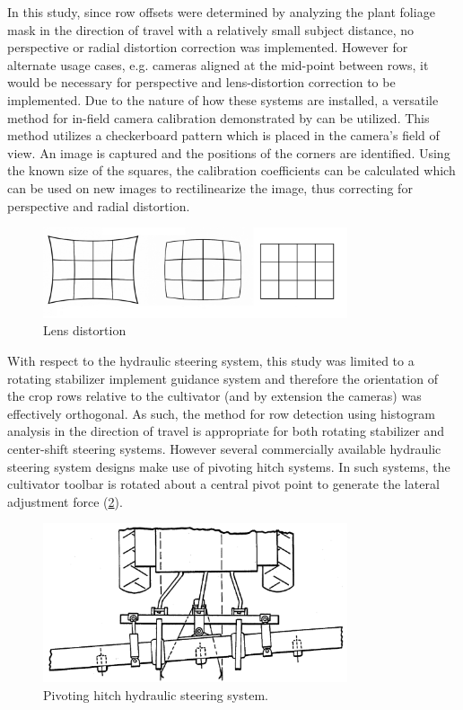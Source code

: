 \documentclass[authoryear]{elsarticle}
\begin{document}
In this study, since row offsets were determined by analyzing the
plant foliage mask in the direction of travel with a relatively small
subject distance, no perspective or radial distortion correction was
implemented. However for alternate usage cases, e.g. cameras aligned
at the mid-point between rows, it would be necessary for perspective
and lens-distortion correction to be implemented. Due to the nature of
how these systems are installed, a versatile method for in-field
camera calibration demonstrated by \citet{lee2002} can be
utilized. This method utilizes a checkerboard pattern which is placed
in the camera’s field of view. An image is captured and the positions
of the corners are identified. Using the known size of the squares,
the calibration coefficients can be calculated which can be used on
new images to rectilinearize the image, thus correcting for
perspective and radial distortion.

\begin{figure}
  \centering
  \includegraphics[width=0.8\textwidth,natwidth=610,natheight=642]{lens_distortion.jpg}
  \caption{Lens distortion}
  \label{fig:distortion}
\end{figure}

With respect to the hydraulic steering system, this study was limited
to a rotating stabilizer implement guidance system
and therefore the orientation of the crop rows relative to the
cultivator (and by extension the cameras) was effectively
orthogonal. As such, the method for row detection using histogram
analysis in the direction of travel is appropriate for both rotating
stabilizer and center-shift steering systems. However several
commercially available hydraulic steering system designs make use of
pivoting hitch systems. In such systems, the cultivator toolbar is
rotated about a central pivot point to generate the lateral adjustment
force (\ref{fig:pivoting_hitch}).

\begin{figure}
  \centering
  \includegraphics[width=0.8\textwidth,natwidth=610,natheight=642]{pivoting_hitch.png}
  \caption{Pivoting hitch hydraulic steering system.}
  \label{fig:pivoting_hitch}
\end{figure}
\end{document}
